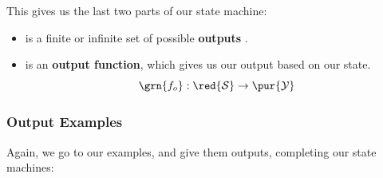             This gives us the last two parts of our state machine:
            
            \begin{itemize}
                \item {} is a finite or infinite set of possible \textbf{outputs} .
                
                \item {} is an \textbf{output function}, which gives us our output based on our state.
                    \begin{equation}
                        \grn{f_o}: \red{\mathcal{S}} \rightarrow \pur{\mathcal{Y}}
                    \end{equation}
            \end{itemize}
        
        \subsecdiv
        
        \subsubsection{Output Examples}
        
            Again, we go to our examples, and give them outputs, completing our state machines:
            
